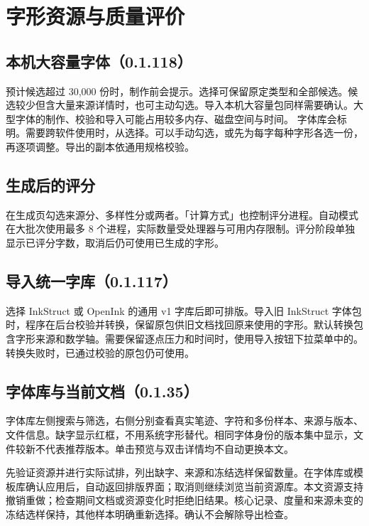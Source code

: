 \chapter{字形资源与质量评价}\label{ch:resources}
\section{本机大容量字体（0.1.118）}
预计候选超过 30,000 份时，制作前会提示。选择可保留原定类型和全部候选。候选较少但含大量来源详情时，也可主动勾选。导入本机大容量包同样需要确认。大型字体的制作、校验和导入可能占用较多内存、磁盘空间与时间。
字体库会标明。需要跨软件使用时，从选择。可以手动勾选，或先为每字每种字形各选一份，再逐项调整。导出的副本依通用规格校验。

\section{生成后的评分}
在生成页勾选来源分、多样性分或两者。「计算方式」也控制评分进程。自动模式在大批次使用最多 8 个进程，实际数量受处理器与可用内存限制。评分阶段单独显示已评分字数，取消后仍可使用已生成的字形。

\section{导入统一字库（0.1.117）}
选择 InkStruct 或 OpenInk 的通用 v1 字库后即可排版。导入旧 InkStruct 字体包时，程序在后台校验并转换，保留原包供旧文档找回原来使用的字形。默认转换包含字形来源和数学轴。需要保留逐点压力和时间时，使用导入按钮下拉菜单中的。转换失败时，已通过校验的原包仍可使用。

\section{字体库与当前文档（0.1.35）}
字体库左侧搜索与筛选，右侧分别查看真实笔迹、字符和多份样本、来源与版本、文件信息。缺字显示红框，不用系统字形替代。相同字体身份的版本集中显示，文件较新不代表推荐版本。单击预览与双击详情均不自动更换本文。

先验证资源并进行实际试排，列出缺字、来源和冻结选样保留数量。在字体库或模板库确认应用后，自动返回排版界面；取消则继续浏览当前资源库。本文资源支持撤销重做；检查期间文档或资源变化时拒绝旧结果。核心记录、度量和来源未变的冻结选样保持，其他样本明确重新选择。确认不会解除导出检查。

